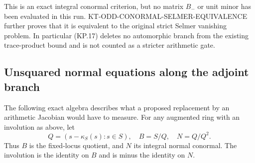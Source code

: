 \documentclass[11pt,a4paper]{article}
\theoremstyle{definition}
\begin{document}
This is an exact integral conormal criterion, but no
matrix $B_-$ or unit minor has been evaluated in this run.
KT-ODD-CONORMAL-SELMER-EQUIVALENCE further proves that
it is equivalent to the original strict Selmer vanishing
problem.  In particular (KP.17) deletes no automorphic
branch from the existing trace-product bound and is not
counted as a stricter arithmetic gate.

\subsection{Unsquared normal equations along the adjoint branch}

The following exact algebra describes what a proposed
replacement by an arithmetic Jacobian would have to measure.
For any augmented ring with an involution as above, let
\[
 Q=(s-\kappa_S(s):s\in S),\quad B=S/Q,\quad N=Q/Q^2.         \tag{KP.19}
\]
Thus $B$ is the fixed-locus quotient, and $N$ its integral
normal conormal.  The involution is the identity on $B$
and is minus the identity on $N$.
\end{document}
